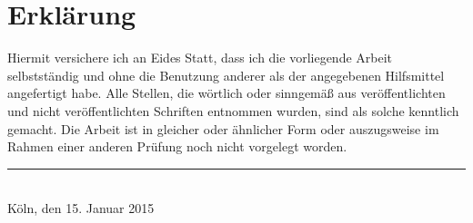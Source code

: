 \section*{Erklärung}
{}

Hiermit versichere ich an Eides Statt, dass ich die vorliegende Arbeit selbstständig und ohne die Benutzung anderer als der angegebenen Hilfsmittel angefertigt habe. 
Alle Stellen, die wörtlich oder sinngemäß aus veröffentlichten und nicht veröffentlichten Schriften entnommen wurden, sind als solche kenntlich gemacht. 
Die Arbeit ist in gleicher oder ähnlicher Form oder auszugsweise im Rahmen einer anderen Prüfung noch nicht vorgelegt worden.

\vspace{20mm}
\begin{flushleft}
    \rule{7cm}{0.4pt}\\
    \vspace{-2mm}
    Köln, den 15. Januar 2015
\end{flushleft}